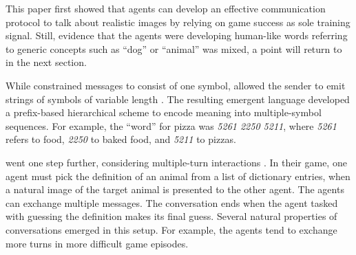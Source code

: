 This paper first
showed that agents can develop an effective communication protocol to talk about realistic
images by relying on game success as sole training signal. Still, evidence that the agents were developing human-like words referring to generic concepts such as ``dog'' or ``animal'' was mixed,
a point will return to in the next section.

While  constrained messages to consist of one
symbol,  allowed the sender to emit strings
of symbols of variable length
\cite<see also>{Lazaridou:etal:2018}. The resulting emergent language developed
a prefix-based hierarchical scheme to encode meaning into
multiple-symbol sequences. For example, the ``word'' for pizza was
\emph{5261 2250 5211}, where \emph{5261} refers to food, \emph{2250}
to baked food, and \emph{5211} to pizzas. %

 went one step further, considering multiple-turn
interactions \cite<see also>{Jorge:etal:2016}.
In their game, one agent
must pick the definition of an animal from a list of dictionary
entries, when a natural image of the target animal is presented to
the other agent. %
The agents can exchange
multiple messages. The conversation ends when
the agent tasked with guessing the definition makes its
final guess.  Several natural
properties of conversations emerged in this setup. For example, the
agents tend to exchange more turns in more difficult game
episodes. %



